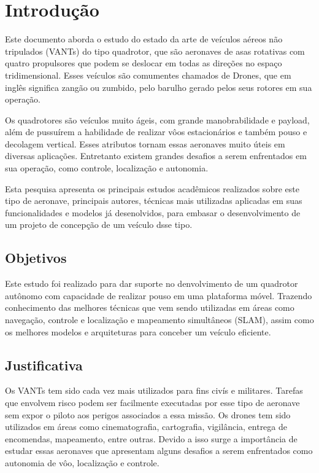 \chapter{Introdução}
\label{chap:intro}

Este documento aborda o estudo do estado da arte de veículos aéreos não tripulados (VANTs) do tipo quadrotor, que são aeronaves de asas rotativas com quatro propulsores que podem se deslocar em todas as direções no espaço tridimensional. Esses veículos são comumentes chamados de Drones, que em inglês significa zangão ou zumbido, pelo barulho gerado pelos seus rotores em sua operação.

Os quadrotores são veículos muito ágeis, com grande manobrabilidade e payload, além de pussuírem a habilidade de realizar vôos estacionários e também pouso e decolagem vertical. Esses atributos tornam essas aeronaves muito úteis em diversas aplicações. Entretanto existem grandes desafios a serem enfrentados em sua operação, como controle, localização e autonomia.

Esta pesquisa apresenta os principais estudos acadêmicos realizados sobre este tipo de aeronave, principais autores, técnicas mais utilizadas aplicadas em suas funcionalidades e modelos já desenolvidos, para embasar o desenvolvimento de um projeto de concepção de um veículo dsse tipo.

\section{Objetivos}
\label{sec:obj}

Este estudo foi realizado para dar suporte no denvolvimento de um quadrotor autônomo com capacidade de realizar pouso em uma plataforma móvel. Trazendo conhecimento das melhores técnicas que vem sendo utilizadas em áreas como navegação, controle e localização e mapeamento simultâneos (SLAM), assim como os melhores modelos e arquiteturas para conceber um veículo eficiente.

\section{Justificativa}
\label{sec:justi}

Os VANTs tem sido cada vez mais utilizados para fins civís e militares. Tarefas que envolvem risco podem ser facilmente executadas por esse tipo de aeronave sem expor o piloto aos perigos associados a essa missão. Os drones tem sido utilizados em áreas como cinematografia, cartografia, vigilância, entrega de encomendas, mapeamento, entre outras. Devido a isso surge a importância de estudar essas aeronaves que apresentam alguns desafios a serem enfrentados como autonomia de vôo, localização e controle.

